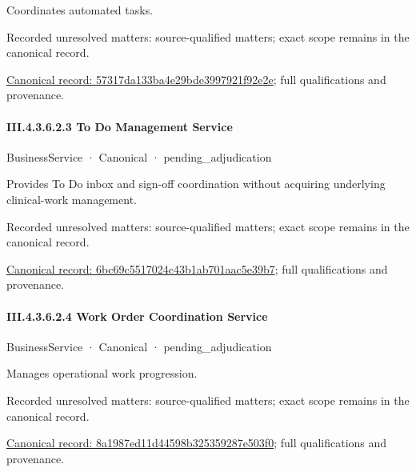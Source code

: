 Coordinates automated tasks.


{\small Recorded unresolved matters: source-qualified matters; exact scope remains in the canonical record.}\par
{\footnotesize \href{../../../../../../../../continuum/business/business-service/57317da133ba4e29bde3997921f92e2e.md}{Canonical record: 57317da133ba4e29bde3997921f92e2e}; full qualifications and provenance.}\par
\paragraph*{III.4.3.6.2.3 To Do Management Service}
\label{navigation:III.4.3.6.2.3}

\label{element:6bc69c5517024c43b1ab701aac5e39b7}
{\small BusinessService · Canonical · pending\_adjudication}\par

Provides To Do inbox and sign-off coordination without acquiring underlying clinical-work management.


{\small Recorded unresolved matters: source-qualified matters; exact scope remains in the canonical record.}\par
{\footnotesize \href{../../../../../../../../continuum/business/business-service/6bc69c5517024c43b1ab701aac5e39b7.md}{Canonical record: 6bc69c5517024c43b1ab701aac5e39b7}; full qualifications and provenance.}\par
\paragraph*{III.4.3.6.2.4 Work Order Coordination Service}
\label{navigation:III.4.3.6.2.4}

\label{element:8a1987ed11d44598b325359287e503f0}
{\small BusinessService · Canonical · pending\_adjudication}\par

Manages operational work progression.


{\small Recorded unresolved matters: source-qualified matters; exact scope remains in the canonical record.}\par
{\footnotesize \href{../../../../../../../../continuum/business/business-service/8a1987ed11d44598b325359287e503f0.md}{Canonical record: 8a1987ed11d44598b325359287e503f0}; full qualifications and provenance.}\par
